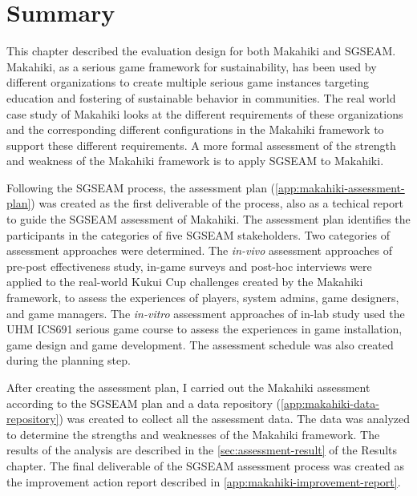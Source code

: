\section{Summary}

This chapter described the evaluation design for both Makahiki and SGSEAM.  Makahiki, as a serious game framework for sustainability, has been used by different organizations to create multiple serious game instances targeting education and fostering of sustainable behavior in communities. The real world case study of Makahiki looks at the different requirements of these organizations and the corresponding different configurations in the Makahiki framework to support these different requirements. A more formal assessment of the strength and weakness of the Makahiki framework is to apply SGSEAM to Makahiki.

Following the SGSEAM process, the assessment plan (\autoref{app:makahiki-assessment-plan}) was created as the first deliverable of the process, also as a techical report \cite{csdl2-13-11} to guide the SGSEAM assessment of Makahiki. The assessment plan identifies the participants in the categories of five SGSEAM stakeholders. Two categories of assessment approaches were determined. The {\em in-vivo} assessment approaches of pre-post effectiveness study, in-game surveys and post-hoc interviews were applied to the real-world Kukui Cup challenges created by the Makahiki framework, to assess the experiences of players, system admins, game designers, and game managers. The {\em in-vitro} assessment approaches of in-lab study used the UHM ICS691 serious game course to assess the experiences in game installation, game design and game development. The assessment schedule was also created during the planning step.

After creating the assessment plan, I carried out the Makahiki assessment according to the SGSEAM plan and a data repository (\autoref{app:makahiki-data-repository}) was created to collect all the assessment data. The data was analyzed to determine the strengths and weaknesses of the Makahiki framework. The results of the analysis are described in the \autoref{sec:assessment-result} of the Results chapter. The final deliverable of the SGSEAM assessment process was created as the improvement action report described in \autoref{app:makahiki-improvement-report}.
